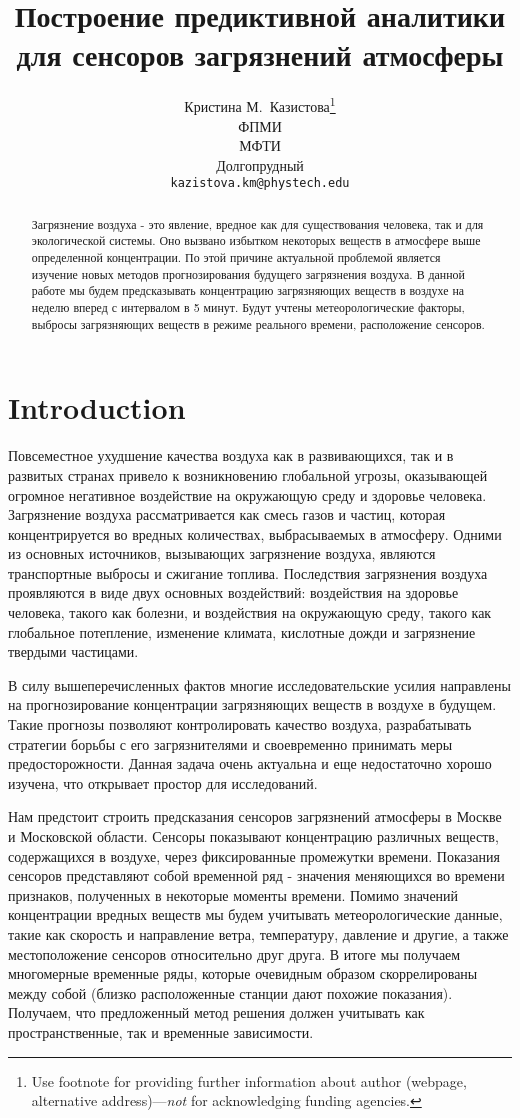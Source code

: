 \documentclass{article}
\title{Построение предиктивной аналитики для сенсоров загрязнений атмосферы}
\author{ Кристина М.~Казистова\thanks{Use footnote for providing further
		information about author (webpage, alternative
		address)---\emph{not} for acknowledging funding agencies.} \\
	ФПМИ\\
	МФТИ\\
	Долгопрудный \\
	\texttt{kazistova.km@phystech.edu} \\
}
\date{}
\begin{document}
\maketitle

\begin{abstract}
Загрязнение воздуха - это явление, вредное как для существования человека, так и для экологической системы. Оно вызвано избытком некоторых веществ в атмосфере выше определенной концентрации. По этой причине актуальной проблемой является изучение новых методов прогнозирования будущего загрязнения воздуха. В данной работе мы будем предсказывать концентрацию загрязняющих веществ в воздухе на неделю вперед с интервалом в 5 минут. Будут учтены метеорологические факторы, выбросы загрязняющих веществ в режиме реального времени, расположение сенсоров. 
\end{abstract}

\section{Introduction}
Повсеместное ухудшение качества воздуха как в развивающихся, так и в развитых странах привело к возникновению глобальной угрозы, оказывающей огромное негативное воздействие на окружающую среду и здоровье человека. Загрязнение воздуха рассматривается как смесь газов и частиц, которая концентрируется во вредных количествах, выбрасываемых в атмосферу. Одними из основных источников, вызывающих загрязнение воздуха, являются транспортные выбросы и сжигание топлива. Последствия загрязнения воздуха проявляются в виде двух основных воздействий: воздействия на здоровье человека, такого как болезни, и воздействия на окружающую среду, такого как глобальное потепление, изменение климата, кислотные дожди и загрязнение твердыми частицами. 

В силу вышеперечисленных фактов многие исследовательские усилия направлены на прогнозирование концентрации загрязняющих веществ в воздухе в будущем. Такие прогнозы позволяют контролировать качество воздуха, разрабатывать стратегии борьбы с его загрязнителями и своевременно принимать меры предосторожности. Данная задача очень актуальна и еще недостаточно хорошо изучена, что открывает простор для исследований. 

Нам предстоит строить предсказания сенсоров загрязнений атмосферы в Москве и Московской области. Сенсоры показывают концентрацию различных веществ, содержащихся в воздухе, через фиксированные промежутки времени. Показания сенсоров представляют собой временной ряд - значения меняющихся во времени признаков, полученных в некоторые моменты времени. Помимо значений концентрации вредных веществ мы будем учитывать метеорологические данные, такие как скорость и направление ветра, температуру, давление и другие, а также местоположение сенсоров относительно друг друга. В итоге мы получаем многомерные временные ряды, которые очевидным образом скоррелированы между собой (близко расположенные станции дают похожие показания). Получаем, что предложенный метод решения должен учитывать как пространственные, так и временные зависимости. 
\end{document}
